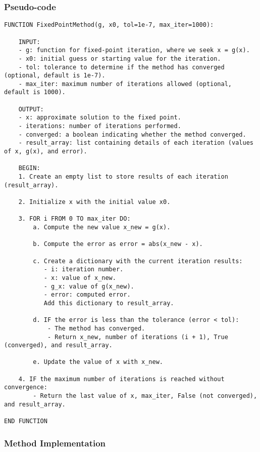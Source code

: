 \documentclass{article}
\begin{document}
    \subsubsection{Pseudo-code}
\begin{lstlisting}
FUNCTION FixedPointMethod(g, x0, tol=1e-7, max_iter=1000):

    INPUT:
    - g: function for fixed-point iteration, where we seek x = g(x).
    - x0: initial guess or starting value for the iteration.
    - tol: tolerance to determine if the method has converged (optional, default is 1e-7).
    - max_iter: maximum number of iterations allowed (optional, default is 1000).

    OUTPUT:
    - x: approximate solution to the fixed point.
    - iterations: number of iterations performed.
    - converged: a boolean indicating whether the method converged.
    - result_array: list containing details of each iteration (values of x, g(x), and error).

    BEGIN:
    1. Create an empty list to store results of each iteration (result_array).

    2. Initialize x with the initial value x0.

    3. FOR i FROM 0 TO max_iter DO:
        a. Compute the new value x_new = g(x).

        b. Compute the error as error = abs(x_new - x).

        c. Create a dictionary with the current iteration results:
           - i: iteration number.
           - x: value of x_new.
           - g_x: value of g(x_new).
           - error: computed error.
           Add this dictionary to result_array.

        d. IF the error is less than the tolerance (error < tol):
            - The method has converged.
            - Return x_new, number of iterations (i + 1), True (converged), and result_array.

        e. Update the value of x with x_new.

    4. IF the maximum number of iterations is reached without convergence:
        - Return the last value of x, max_iter, False (not converged), and result_array.

END FUNCTION
\end{lstlisting}

    \subsubsection{Method Implementation}
\end{document}
